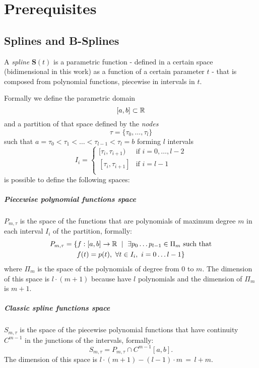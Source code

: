 \documentclass[dissertation.tex]{subfiles}
\begin{document}
\chapter{Prerequisites}
\section{Splines and B-Splines}\label{sec:spline}
A \emph{spline} $\mathbf{S}(t)$ is a parametric function - defined in a certain space
(bidimensional in this work) as a
function of a certain parameter $t$ - that is composed from polynomial
functions, piecewise in intervals in $t$.

Formally we define the parametric domain
$$[a,b]\subset\mathbb{R}$$
and a partition of that space defined by the \emph{nodes}
$$\tau = \{\tau_0,\dots,\tau_l\}$$
such that $a=\tau_0<\tau_1<\dots<\tau_{l-1}<\tau_l=b$ forming $l$
intervals
$$
I_i=
\begin{cases}
  [\tau_i,\tau_{i+1}) & \mbox{if } i=0,\dots,l-2\\
    [\tau_i,\tau_{i+1}] & \mbox{if } i=l-1\\
\end{cases}
$$
is possible to define the following spaces:
\paragraph{Piecewise polynomial functions space} $P_{m,\tau}$
is the space of the functions that are polynomials of maximum degree $m$
in each interval $I_i$ of the partition, formally:
\begin{multline*}
  P_{m,\tau}=\{f:[a,b]\rightarrow\mathbb{R}\ \mid\ \exists p_0\dots
  p_{l-1}\in\Pi_m \ \text{such that}\\
  f(t)=p(t),\ \forall t\in I_i,\
  i=0\dots l-1\}
\end{multline*}
where $\Pi_m$ is the space of the polynomials of degree from $0$ to
$m$. The dimension of this space is $l\cdot(m+1)$ because have $l$
polynomials and the dimension of $\Pi_m$ is $m+1$.
\paragraph{Classic spline functions space} $S_{m,\tau}$ is the space of
the piecewise polynomial functions that have continuity $C^{m-1}$ in
the junctions of the intervals, formally:
$$
S_{m,\tau}=P_{m,\tau}\cap C^{m-1}[a,b].
$$
The dimension of this space is $l\cdot(m+1)-(l-1)\cdot m\,=\,l+m$.
\end{document}
